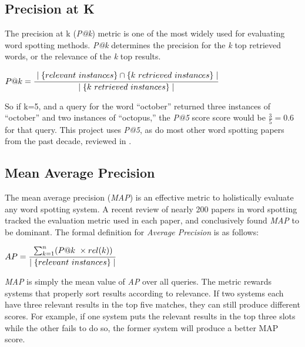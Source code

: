 \documentclass[final]{ukthesis}
\begin{document}
\subsection{Precision at K}
The precision at k ({\em P@k}) metric is one of the most widely used for evaluating word spotting methods. {\em P@k} determines the precision for the {\em k} top retrieved words, or the relevance of the {\em k} top results.
\begin{center}
\begin{math}
{P@k}=\cfrac{\mid\{relevant\ instances\}\cap\{k\ retrieved\ instances\}\mid} {\mid \{k\ retrieved\ instances\}\mid}
\end{math}
\end{center}

So if k=5, and a query for the word ``october'' returned three instances of ``october'' and two instances of ``octopus,'' the {\em P@5} score score would be \begin{math}\frac{3}{5} = 0.6\end{math} for that query. This project uses {\em P@5}, as do most other word spotting papers from the past decade, reviewed in \cite{giotis2017survey}.


\subsection{Mean Average Precision}
The mean average precision ({\em MAP}) is an effective metric to holistically evaluate any word spotting system. A recent review \cite{giotis2017survey} of nearly 200 papers in word spotting tracked the evaluation metric used in each paper, and conclusively found {\em MAP} to be dominant. The formal definition for {\em Average Precision} is as follows:

\begin{center}
\begin{math}
{AP}=\cfrac{\sum_{k=1}^n (P@k\ \times rel(k))}{\mid\{relevant \ instances\}\mid}
\end{math}
\end{center}

{\em MAP} is simply the mean value of {\em AP} over all queries. The metric rewards systems that properly sort results according to relevance. If two systems each have three relevant results in the top five matches, they can still produce different scores. For example, if one system puts the relevant results in the top three slots while the other fails to do so, the former system will produce a better MAP score.
\end{document}
